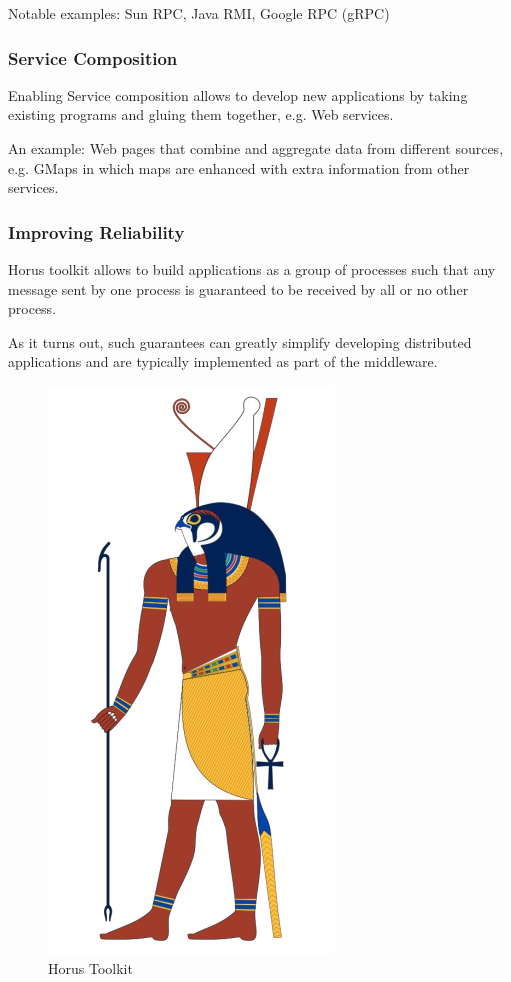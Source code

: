Notable examples: Sun RPC, Java RMI, Google RPC (gRPC)

\subsubsection{Service Composition}
Enabling Service composition allows to develop new applications by taking existing programs and gluing them together, e.g. Web services.

An example: Web pages that combine and aggregate data from different sources, e.g. GMaps in which maps are enhanced with extra information from other services.

\subsubsection{Improving Reliability}

\begin{paracol}{2}
   
   
   Horus toolkit allows to build applications as a group of processes such that any message sent by one process is guaranteed to be received by all or no other process.
   
   As it turns out, such guarantees can greatly simplify developing distributed applications and are typically implemented as part of the middleware.


   \switchcolumn

   \begin{figure}[htbp]
      \centering
      \includegraphics[width=0.2\columnwidth]{images/02/horus.png}
      \caption{Horus Toolkit}
      \label{fig:02/horus}
   \end{figure}   

\end{paracol}   

